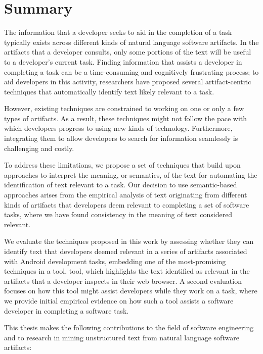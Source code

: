 \setcounter{chapter}{7}


\chapter{Summary}
\label{ch:summary}



The information that a developer seeks to aid in the completion of a task typically exists across different kinds of natural language software artifacts. In the artifacts that a developer consults, only some portions of the text will be useful to a developer's current task.
Finding information that assists a developer in completing a task can be a time-consuming and cognitively frustrating process; to aid developers in this activity, researchers have proposed several artifact-centric techniques that automatically identify text likely relevant to a task.


However, existing techniques are constrained to working on one or only a  few types of artifacts. As a result, these techniques might not follow the pace with which developers progress to using new kinds of technology. Furthermore, integrating them to allow developers to search for information seamlessly is challenging and costly.


To address these limitations, we propose 
a set of techniques that 
build upon approaches to interpret the meaning, or semantics, of the text 
for automating the identification of text relevant to a task.
Our decision to use semantic-based approaches arises from the empirical 
analysis of text originating from different kinds of artifacts 
that developers deem relevant to completing a set of software tasks,
where we have found consistency in the meaning of text considered relevant.



We evaluate the  techniques proposed in this work by assessing 
whether they can identify text that developers deemed relevant in a series of artifacts 
associated with Android development tasks, 
embedding one of the most-promising techniques in a tool, \acs{tool},
which highlights the text identified as relevant in the artifacts 
that a developer inspects in their web browser. 
A second evaluation focuses on how this tool might assist developers  
while they work on a task, where we provide 
initial empirical evidence on how  
such a tool assists a software developer in completing a software task. 




This thesis makes the following contributions to the field of software engineering and to research in mining unstructured text from natural language software artifacts:



